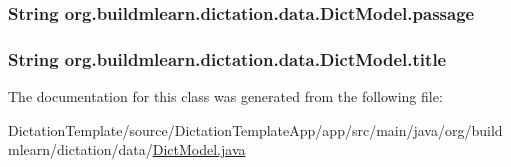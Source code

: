 \subsubsection[{\texorpdfstring{passage}{passage}}]{\setlength{\rightskip}{0pt plus 5cm}String org.\+buildmlearn.\+dictation.\+data.\+Dict\+Model.\+passage\hspace{0.3cm}{\ttfamily [private]}}\hypertarget{classorg_1_1buildmlearn_1_1dictation_1_1data_1_1DictModel_a6b9ba2d7f22e05f502fc1a0d8f87fa07}{}\label{classorg_1_1buildmlearn_1_1dictation_1_1data_1_1DictModel_a6b9ba2d7f22e05f502fc1a0d8f87fa07}
\subsubsection[{\texorpdfstring{title}{title}}]{\setlength{\rightskip}{0pt plus 5cm}String org.\+buildmlearn.\+dictation.\+data.\+Dict\+Model.\+title\hspace{0.3cm}{\ttfamily [private]}}\hypertarget{classorg_1_1buildmlearn_1_1dictation_1_1data_1_1DictModel_a6dff5f3fd1ed4d80623367c54a5aef25}{}\label{classorg_1_1buildmlearn_1_1dictation_1_1data_1_1DictModel_a6dff5f3fd1ed4d80623367c54a5aef25}


The documentation for this class was generated from the following file\+:\begin{DoxyCompactItemize}
\item 
Dictation\+Template/source/\+Dictation\+Template\+App/app/src/main/java/org/buildmlearn/dictation/data/\hyperlink{DictModel_8java}{Dict\+Model.\+java}\end{DoxyCompactItemize}
